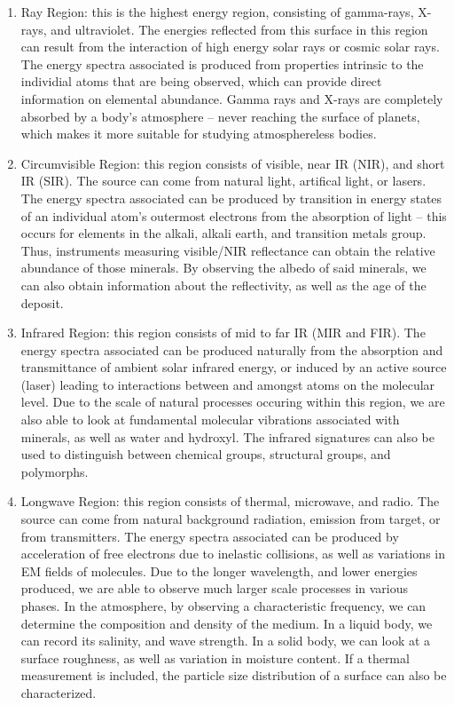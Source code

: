 \documentclass[a4, 12 pt]{article} %
\begin{document}
\begin{enumerate}
\item Ray Region: this is the highest energy region, consisting of gamma-rays, X-rays, and ultraviolet. The energies reflected from this surface in this region can result from the interaction of high energy solar rays or cosmic solar rays. The energy spectra associated is produced from properties intrinsic to the individial atoms that are being observed, which can provide direct information on elemental abundance. Gamma rays and X-rays are completely absorbed by a body's atmosphere -- never reaching the surface of planets, which makes it more suitable for studying atmosphereless bodies.
\item Circumvisible Region: this region consists of visible, near IR (NIR), and short IR (SIR). The source can come from natural light, artifical light, or lasers. The energy spectra associated can be produced by transition in energy states of an individual atom's outermost electrons from the absorption of light -- this occurs for elements in the alkali, alkali earth, and transition metals group. Thus, instruments measuring visible/NIR reflectance can obtain the relative abundance of those minerals. By observing the albedo of said minerals, we can also obtain information about the reflectivity, as well as the age of the deposit.
\item Infrared Region: this region consists of mid to far IR (MIR and FIR). The energy spectra associated can be produced naturally from the absorption and transmittance of ambient solar infrared energy, or induced by an active source (laser) leading to interactions between and amongst atoms on the molecular level. Due to the scale of natural processes occuring within this region, we are also able to look at fundamental molecular vibrations associated with minerals, as well as water and hydroxyl. The infrared signatures can also be used to distinguish between chemical groups, structural groups, and polymorphs.
\item Longwave Region: this region consists of thermal, microwave, and radio. The source can come from natural background radiation, emission from target, or from transmitters. The energy spectra associated can be produced by acceleration of free electrons due to inelastic collisions, as well as variations in EM fields of molecules. Due to the longer wavelength, and lower energies produced, we are able to observe much larger scale processes in various phases. In the atmosphere, by observing a characteristic frequency, we can determine the composition and density of the medium. In a liquid body, we can record its salinity, and wave strength. In a solid body, we can look at a surface roughness, as well as variation in moisture content. If a thermal measurement is included, the particle size distribution of a surface can also be characterized.

\end{enumerate}
\end{document}
